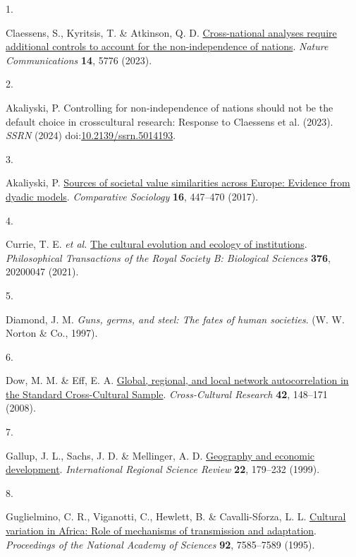 \documentclass[
  man, donotrepeattitle,floatsintext]{apa6}
\newlength{\cslhangindent}
\newlength{\csllabelwidth}
\newlength{\cslentryspacingunit} %
\newenvironment{CSLReferences}[2] %
 {%
  \setlength{\parindent}{0pt}
  \ifodd #1
  \let\oldpar\par
  \def\par{\hangindent=\cslhangindent\oldpar}
  \fi
  \setlength{\parskip}{#2\cslentryspacingunit}
 }%
 {}
\newcommand{\CSLLeftMargin}[1]{\parbox[t]{\csllabelwidth}{#1}}
\newcommand{\CSLRightInline}[1]{\parbox[t]{\linewidth - \csllabelwidth}{#1}\break}
\begin{document}
\hypertarget{refs}{}
\begin{CSLReferences}{0}{0}
\leavevmode{}%
\CSLLeftMargin{1. }%
\CSLRightInline{Claessens, S., Kyritsis, T. \& Atkinson, Q. D. \href{https://doi.org/10.1038/s41467-023-41486-1}{Cross-national analyses require additional controls to account for the non-independence of nations}. \emph{Nature Communications} \textbf{14}, 5776 (2023).}

\leavevmode{}%
\CSLLeftMargin{2. }%
\CSLRightInline{Akaliyski, P. Controlling for non-independence of nations should not be the default choice in crosscultural research: Response to {Claessens} et al. (2023). \emph{SSRN} (2024) doi:\href{https://doi.org/10.2139/ssrn.5014193}{10.2139/ssrn.5014193}.}

\leavevmode{}%
\CSLLeftMargin{3. }%
\CSLRightInline{Akaliyski, P. \href{https://doi.org/10.1163/15691330-12341432}{Sources of societal value similarities across {Europe}: Evidence from dyadic models}. \emph{Comparative Sociology} \textbf{16}, 447--470 (2017).}

\leavevmode{}%
\CSLLeftMargin{4. }%
\CSLRightInline{Currie, T. E. \emph{et al.} \href{https://doi.org/10.1098/rstb.2020.0047}{The cultural evolution and ecology of institutions}. \emph{Philosophical Transactions of the Royal Society B: Biological Sciences} \textbf{376}, 20200047 (2021).}

\leavevmode{}%
\CSLLeftMargin{5. }%
\CSLRightInline{Diamond, J. M. \emph{Guns, germs, and steel: The fates of human societies}. (W. W. Norton \& Co., 1997).}

\leavevmode{}%
\CSLLeftMargin{6. }%
\CSLRightInline{Dow, M. M. \& Eff, E. A. \href{https://doi.org/10.1177/1069397107311186}{Global, regional, and local network autocorrelation in the {Standard Cross-Cultural Sample}}. \emph{Cross-Cultural Research} \textbf{42}, 148--171 (2008).}

\leavevmode{}%
\CSLLeftMargin{7. }%
\CSLRightInline{Gallup, J. L., Sachs, J. D. \& Mellinger, A. D. \href{https://doi.org/10.1177/016001799761012334}{Geography and economic development}. \emph{International Regional Science Review} \textbf{22}, 179--232 (1999).}

\leavevmode{}%
\CSLLeftMargin{8. }%
\CSLRightInline{Guglielmino, C. R., Viganotti, C., Hewlett, B. \& Cavalli-Sforza, L. L. \href{https://doi.org/10.1073/pnas.92.16.7585}{Cultural variation in {Africa}: Role of mechanisms of transmission and adaptation}. \emph{Proceedings of the National Academy of Sciences} \textbf{92}, 7585--7589 (1995).}


\end{CSLReferences}
\end{document}
